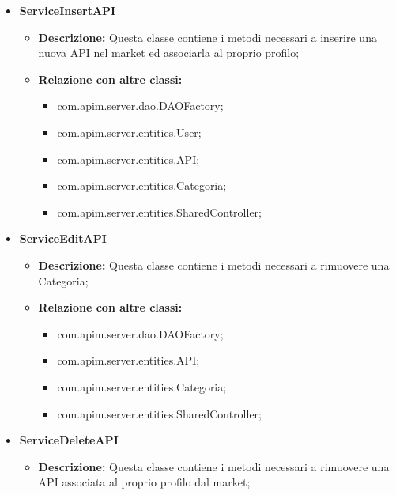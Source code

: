 {{{{\begin{itemize}
\begin{itemize}
\begin{itemize}
              \item com.apim.server.entities.SharedController;
            \end{itemize}
          \end{itemize}
          \item \textbf{ServiceInsertAPI}
          \begin{itemize}
            \item \textbf{Descrizione:} Questa classe contiene i metodi necessari a inserire una nuova API nel market ed associarla al proprio profilo;
            \item \textbf{Relazione con altre classi:}
            \begin{itemize}
              \item com.apim.server.dao.DAOFactory;
              \item com.apim.server.entities.User;
              \item com.apim.server.entities.API;
              \item com.apim.server.entities.Categoria;
              \item com.apim.server.entities.SharedController;
            \end{itemize}
          \end{itemize}
          \item \textbf{ServiceEditAPI}
          \begin{itemize}
            \item \textbf{Descrizione:} Questa classe contiene i metodi necessari a rimuovere una Categoria;
            \item \textbf{Relazione con altre classi:}
            \begin{itemize}
              \item com.apim.server.dao.DAOFactory;
              \item com.apim.server.entities.API;
              \item com.apim.server.entities.Categoria;
              \item com.apim.server.entities.SharedController;
            \end{itemize}
          \end{itemize}
           \item \textbf{ServiceDeleteAPI}
          \begin{itemize}
            \item \textbf{Descrizione:} Questa classe contiene i metodi necessari a rimuovere una API associata al proprio profilo dal market;

\end{itemize}
\end{itemize}}}}}
